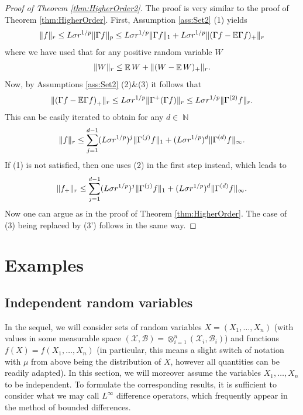 \documentclass[a4paper,12pt]{amsart}
\numberwithin{equation}{section}
\theoremstyle{remark}
\DeclarePairedDelimiter	{\norm}		{\lVert}	{\rVert}
\DeclareMathOperator	{\IE}		{\mathbb{E}}
\DeclareMathOperator	{\IN}		{\mathbb{N}}
\def\E{{\mathbb E}}
\begin{document}
\begin{proof}[Proof of Theorem \ref{thm:HigherOrder2}]
	The proof is very similar to the proof of Theorem \ref{thm:HigherOrder}. First, Assumption \ref{ass:Set2} (1) yields
	\begin{align*}
		\norm{f}_r \le L\sigma r^{1/p} \norm{\Gamma f}_p \le L\sigma r^{1/p} \norm{\Gamma f}_1 + L\sigma r^{1/p} \norm{(\Gamma f - \E \Gamma f)_+}_r
	\end{align*}
	where we have used that for any positive random variable $W$
	\begin{align}		\label{eqn:LpEstimatePositiveFunction}
		\norm{W}_r \le \IE W + \norm{(W - \IE W)_+}_r.
	\end{align}
	Now, by Assumptions \ref{ass:Set2} (2)\&(3) it follows that
	\begin{align*}
		\norm{\left( \Gamma f - \E \Gamma f \right)_+}_r \le L\sigma r^{1/p} \norm{\Gamma^+ (\Gamma f)}_r \le L\sigma r^{1/p} \norm{\Gamma^{(2)}f}_r.
	\end{align*}
	This can be easily iterated to obtain for any $d \in \IN$
	\begin{align*}
		\norm{f}_r \le \sum_{j = 1}^{d-1} (L\sigma r^{1/p})^j \norm{\Gamma^{(j)}f}_1 + (L\sigma r^{1/p})^d \norm{\Gamma^{(d)}f}_\infty.
	\end{align*}
	If (1) is not satisfied, then one uses (2) in the first step instead, which leads to
	\begin{align*}
		\norm{f_+}_r \le \sum_{j = 1}^{d-1} (L\sigma r^{1/p})^j \norm{\Gamma^{(j)}f}_1 + (L\sigma r^{1/p})^d \norm{\Gamma^{(d)}f}_\infty.
	\end{align*}
	Now one can argue as in the proof of Theorem \ref{thm:HigherOrder}. The case of (3) being replaced by (3') follows in the same way.
\end{proof}

\section{Examples}\label{sec:Ex2}

\subsection{Independent random variables}

In the sequel, we will consider sets of random variables $X=(X_1, \ldots, X_n)$ (with values in some measurable space $(\mathcal{X}, \mathcal{B}) = \otimes_{i =1}^n (\mathcal{X}_i, \mathcal{B}_i)$) and functions $f(X) = f(X_1, \ldots, X_n)$ (in particular, this means a slight switch of notation with $\mu$ from above being the distribution of $X$, however all quantities can be readily adapted). In this section, we will moreover assume the variables $X_1, \ldots, X_n$ to be independent. To formulate the corresponding results, it is sufficient to consider what we may call $L^\infty$ difference operators, which frequently appear in the method of bounded differences.
\end{document}
